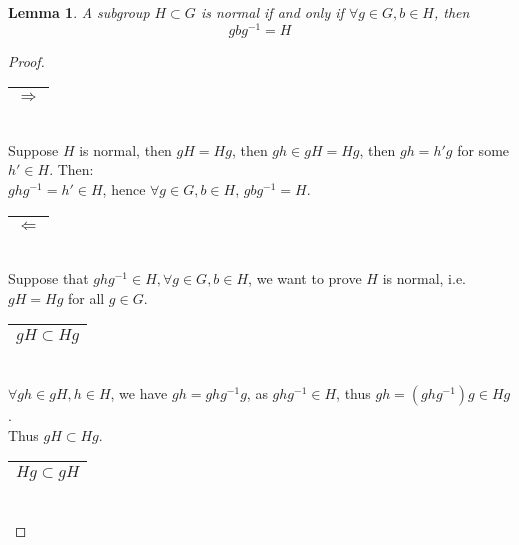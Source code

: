 \documentclass{article}
\theoremstyle{MyNonumberplain}
\theoremstyle{break}
\newtheorem*{proof}{Proof. }
\theoremstyle{break}
\newtheorem{lemma}[theorem]{Lemma}
\theoremstyle{break}
\theoremstyle{definition}
\theoremstyle{break}
\begin{document}
\begin{thmbox}
    \begin{lemma}
        A subgroup $H \subset G$ is normal if and only if $\forall g \in G, b \in H$,
        then
        \[ g b g^{- 1} = H \]
    \end{lemma}
    \begin{prfbox}
        \begin{proof}
            \begin{tabular}{|c|}
                \hline
                $\Rightarrow$\\
                \hline
              \end{tabular}\\
              
              Suppose $H$ is normal, then $g H = H g$, then $g h \in g H = H g$, then $g h =
              h' g$ for some $h' \in H$. Then:\\
              
              $g h g^{- 1} = h' \in H$, hence $\forall g \in G, b \in H$, $g b g^{- 1} =
              H$.\\
              
              \begin{tabular}{|c|}
                \hline
                $\Leftarrow$\\
                \hline
              \end{tabular}\\
              
              Suppose that $g h g^{- 1} \in H, \forall g \in G, b \in H$, we want to prove
              $H$ is normal, i.e. $g H = H g$ for all $g \in G$.\\
              
              \begin{tabular}{|c|}
                \hline
                $g H \subset H g$\\
                \hline
              \end{tabular}\\
              
              $\forall g h \in g H, h \in H$, we have $g h = g h g^{- 1} g$, as $g h g^{- 1}
              \in H$, thus $g h = (g h g^{- 1}) g \in H g$.\\
              
              Thus $g H \subset H g$.\\
              
              \begin{tabular}{|c|}
                \hline
                $H g \subset g H$\\
                \hline
              \end{tabular}\\
              

\end{proof}
\end{prfbox}
\end{thmbox}
\end{document}
